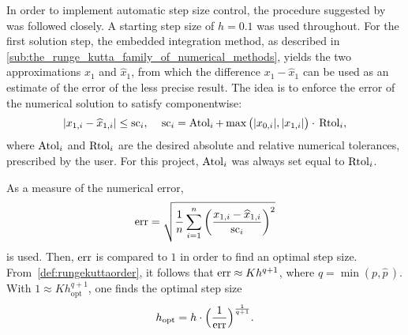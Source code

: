 In order to implement automatic step size control, the procedure suggested
by \textcite[pp.167--168]{hairer1993solving} was followed
closely. A starting step size of $h=0.1$ was used throughout. For the first
solution step, the embedded integration method, as described in
\cref{sub:the_runge_kutta_family_of_numerical_methods}, yields the two
approximations $x_{1}$ and $\widehat{x}_{1}$, from which the difference
$x_{1}-\widehat{x}_{1}$ can be used as an estimate of the error of the less
precise result. The idea is to enforce the error of the numerical solution to
satisfy componentwise:
\begin{equation}
    \label{eq:embeddederror}
    \abs{x_{1,i}-\widehat{x}_{1,i}} \leq \scem_{i},\quad{}%
    \scem_{i}=\atol_{i}+\max\big(\abs{x_{0,i}},\abs{x_{1,i}}\big)\cdot{}\rtol_{i},
\end{equation}
where $\operatorname{Atol}_{i}$ and $\operatorname{Rtol}_{i}$ are the desired absolute and relative
numerical tolerances, prescribed by the user. For this project, $\operatorname{Atol}_{i}$ was
always set equal to $\operatorname{Rtol}_{i}$.

As a measure of the numerical error,
\begin{equation}
    \label{eq:embeddednumericalerror}
    \errem = \sqrt{\frac{1}{n}\sum\limits_{i=1}^{n}%
    {\bigg(\frac{x_{1,i}-\widehat{x}_{1,i}}{\scem_{i}}\bigg)}^{2}}
\end{equation}
is used. Then, $\operatorname{err}$ is compared to $1$ in order to find an optimal step
size. From~\cref{def:rungekuttaorder}, it follows that $\operatorname{err}\approx{}Kh^{q+1}$,
where $q=\min(p,\widehat{p}\,)$. With $1\approx{}Kh_{\mathrm{opt}}^{q+1}$,
one finds the optimal step size
\begin{equation}
    \label{eq:embeddedoptimalstepsize}
    h_{\mathrm{opt}}=h\cdot\Big(\frac{1}{\operatorname{err}}\Big)^{\frac{1}{q+1}}.
\end{equation}

